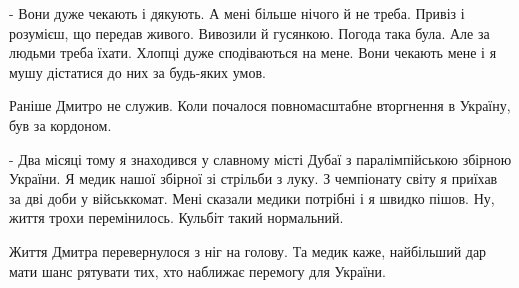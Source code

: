 - Вони дуже чекають і дякують. А мені більше нічого й не треба. Привіз і
розумієш, що передав живого. Вивозили й гусянкою. Погода така була. Але за
людьми треба їхати. Хлопці дуже сподіваються на мене. Вони чекають мене і я
мушу дістатися до них за будь-яких умов.

Раніше Дмитро не служив. Коли почалося повномасштабне вторгнення в Україну, був
за кордоном.

- Два місяці тому я знаходився у славному місті Дубаї з паралімпійською збірною
України. Я медик нашої збірної зі стрільби з луку. З чемпіонату світу я приїхав
за дві доби у військкомат. Мені сказали медики  потрібні і я швидко пішов. Ну,
життя трохи перемінилось. Кульбіт такий нормальний.

Життя Дмитра перевернулося з ніг на голову. Та медик каже, найбільший дар мати
шанс рятувати тих, хто наближає перемогу для України.

